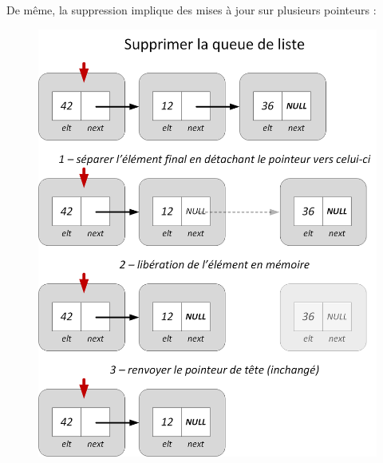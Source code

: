 \documentclass[11pt,a4paper]{article}
\begin{document}
\clearpage

De même, la suppression implique des mises à jour sur plusieurs pointeurs :

\vfillFirst

\begin{figure}[ht!]
\centering
\centerline{   %
\includegraphics[scale=0.85]{img/listes/Listes_Pointeurs_4_1_suppression_queue.png}
}
\end{figure}

\vfillLast

\clearpage

\vfillFirst
\end{document}
